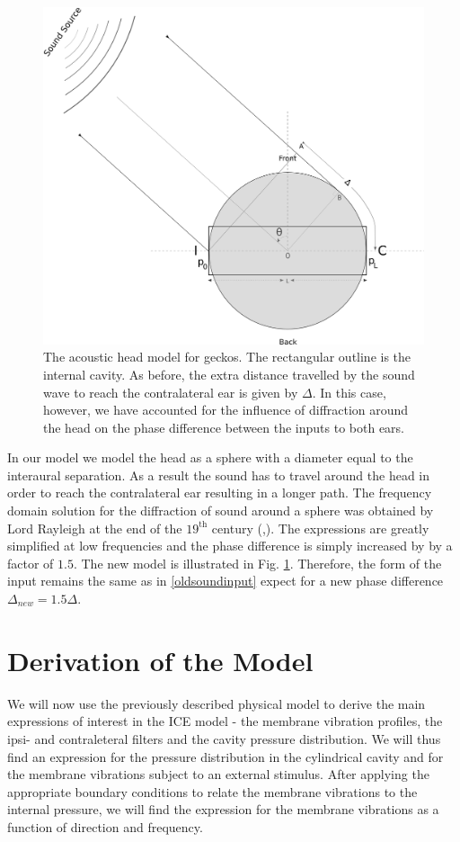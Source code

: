 \begin{figure}[ht]
 \includegraphics[width=.75\linewidth]{Diagrams/acousticheadmodel2.png}
 \caption[New acoustic head model for geckos]{The acoustic head model for geckos. The rectangular outline 
 is the internal cavity. As before, the extra distance travelled by the sound wave to reach the contralateral ear is given by 
 $\Delta$. In this case, however, we have accounted for the influence of diffraction around the head on the phase difference between the inputs
 to both ears.}
 \label{newheadmodel}
\end{figure}
In our model we model the head as a sphere with a diameter equal to the interaural separation. As a result the sound has to travel around the 
head in order to reach the contralateral ear resulting in a longer path. The frequency domain solution for the diffraction of sound around a
sphere was obtained by Lord Rayleigh at the end of the $19^{\mbox{th}}$ century (\cite{rayleigh1},\cite{rayleigh2}). The expressions 
are greatly simplified at low frequencies and the phase difference is simply increased by by a factor of $1.5$. The new model is illustrated in Fig. \ref{newheadmodel}.
Therefore, the form of the input remains the same as in \eqref{oldsoundinput} expect for a new phase difference  $\Delta_{new}=1.5\Delta$.

\section{Derivation of the Model}
We will now use the previously described physical model to derive the main expressions of interest in the ICE model - the membrane
vibration profiles, the ipsi- and contraleteral filters and the cavity pressure distribution. We will thus find an expression for the pressure 
distribution in the cylindrical cavity and for the membrane vibrations subject to an external stimulus. After applying the 
appropriate boundary conditions to relate the membrane vibrations to the internal pressure, we will find the expression for the membrane
vibrations as a function of direction and frequency.

